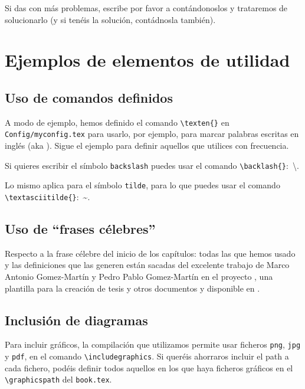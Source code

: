 Si das con más problemas, escribe por favor a \contactauthor
contándonoslos y trataremos de solucionarlo (y si tenéis la solución,
contádnosla también).


\section{Ejemplos de elementos de utilidad}
\label{sec:ejempl-de-elem}

\subsection{Uso de comandos definidos}
\label{sec:uso-de-comandos}

A modo de ejemplo, hemos definido el comando
\texttt{\textbackslash{}texten\{\}} en \texttt{Config/myconfig.tex} para
usarlo, por ejemplo, para marcar palabras escritas en inglés (aka
). Sigue el ejemplo para definir aquellos que utilices
con frecuencia.

Si quieres escribir el símbolo \texttt{backslash} puedes usar el comando
\texttt{\textbackslash{}backlash\{\}}:~\textbackslash{}.

Lo mismo aplica para el símbolo \texttt{tilde}, para lo que puedes usar
el comando \texttt{\textbackslash{}textasciitilde\{\}}:~\textasciitilde{}.


\subsection{Uso de ``frases célebres''}
\label{sec:uso-de-frases}

Respecto a la frase célebre del inicio de los capítulos: todas las que
hemos usado y las definiciones que las generen están sacadas del
excelente trabajo de Marco Antonio Gomez-Martín y Pedro Pablo
Gomez-Martín en el proyecto \texis, una plantilla para la creación de
tesis y otros documentos y disponible en \cite{texis}.


\subsection{Inclusión de diagramas}
\label{sec:diagrama}

Para incluir gráficos, la compilación que utilizamos permite usar
ficheros \texttt{png}, \texttt{jpg} y \texttt{pdf}, en el comando
\texttt{\textbackslash{}includegraphics}. Si queréis ahorraros incluir
el path a cada fichero, podéis definir todos aquellos en los que haya
ficheros gráficos en el \texttt{\textbackslash{}graphicspath} del
\texttt{book.tex}.

